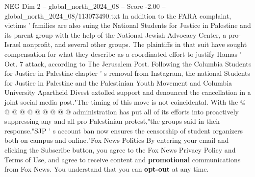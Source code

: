 \begin{textsample}{NEG Dim 2 – global\_north\_2024\_08 – Score -2.00 – global\_north\_2024\_08/113073490.txt}
In addition to the FARA complaint, victims ' families are also suing the National Students for Justice in Palestine and its parent group with the help of the National Jewish Advocacy Center, a pro-Israel nonprofit, and several other groups.
The plaintiffs in that suit have sought compensation for what they describe as a coordinated effort to justify Hamas ' Oct. 7 attack, according to The Jerusalem Post.
Following the Columbia Students for Justice in Palestine chapter ' s removal from Instagram, the national Students for Justice in Palestine and the Palestinian Youth Movement and Columbia University Apartheid Divest extolled support and denounced the cancellation in a joint social media post."The timing of this move is not coincidental.
With the @ @ @ @ @ @ @ @ @ @ administration has put all of its efforts into proactively suppressing any and all pro-Palestinian protest,"the groups said in their response."SJP ' s account ban now ensures the censorship of student organizers both on campus and online."Fox News Politics By entering your email and clicking the Subscribe button, you agree to the Fox News Privacy Policy and Terms of Use, and agree to receive content and \textbf{promotional} communications from Fox News.
You understand that you can \textbf{opt-out} at any time.

\end{textsample}

